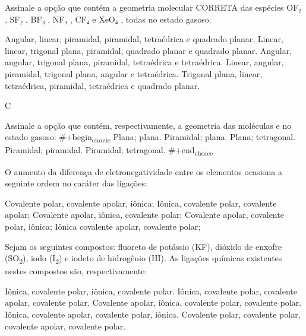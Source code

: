 \documentclass[9qpt]{scrartcl}
\begin{document}
\begin{exercise}[points=1]
Assinale a opção que contém a geometria molecular CORRETA das espécies OF₂ , SF₂ , BF₃ , NF₃ , CF₄ e XeO₄ , todas no estado gasoso. 

\begin{choice}
\choice Angular, linear, piramidal, piramidal, tetraédrica e quadrado planar. 
\choice Linear, linear, trigonal plana, piramidal, quadrado planar e quadrado planar. 
\choice Angular, angular, trigonal plana, piramidal, tetraédrica e tetraédrica. 
\choice Linear, angular, piramidal, trigonal plana, angular e tetraédrica.
\choice Trigonal plana, linear, tetraédrica, piramidal, tetraédrica e quadrado planar.
\end{choice}
\end{exercise}
\begin{solution}
C
\end{solution}




\begin{exercise}
Assinale a opção que contém, respectivamente, a geometria das moléculas  e  no estado
gasoso:
\#+begin\textsubscript{chocie} 
\choice Plana; plana.
\choice Piramidal; plana.
\choice Plana; tetragonal.
\choice Piramidal; piramidal.
\choice Piramidal; tetragonal.
\#+end\textsubscript{choice}
\end{exercise}








\begin{exercise}[points=1.0]
O aumento da diferença de eletronegatividade entre os elementos ocasiona a seguinte ordem no caráter das ligações:

\begin{choice}
\choice Covalente polar, covalente apolar, iônica;
\choice Iônica, covalente polar, covalente apolar;
\choice Covalente apolar, iônica, covalente polar;
\choice Covalente apolar, covalente polar, iônica;
\choice Iônica covalente apolar, covalente polar;
\end{choice}
\end{exercise}

\begin{exercise}[points=1.0]
Sejam os seguintes compostos: fluoreto de potássio (KF), dióxido de enxofre (SO\textsubscript{2}), iodo (I\textsubscript{2}) e iodeto de hidrogênio (HI). As ligações químicas existentes nestes compostos são, respectivamente:

\begin{choice}
\choice Iônica, covalente polar, iônica, covalente polar.
\choice Iônica, covalente polar, covalente apolar, covalente polar.
\choice Covalente apolar, iônica, covalente polar, covalente polar.
\choice Iônica, covalente apolar, covalente polar, iônica.
\choice Covalente polar, covalente polar, covalente apolar, covalente polar.
\end{choice}
\end{exercise}
\end{document}
